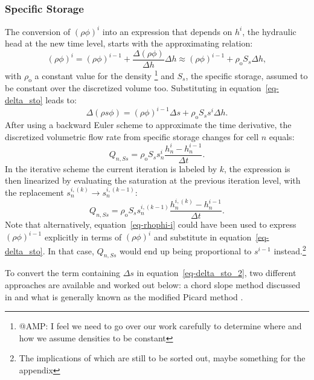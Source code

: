 \documentclass[fleqn]{article}
\begin{document}
\subsubsection*{Specific Storage}
The conversion of $(\rho\phi)^i$ into an expression that depends
on $h^i$, the hydraulic head at the new time level, starts with 
the approximating relation:
\begin{equation}
  (\rho\phi)^i =
  (\rho\phi)^{i-1} + \frac{\Delta (\rho\phi)}{\Delta h} \Delta h \approx
  (\rho\phi)^{i-1} + \rho_\textrm{o} S_s \Delta h,
  \label{eq-rhophi-i}
\end{equation}
with $\rho_{\textrm{o}}$ a constant value for the density
\footnote{@AMP: I feel we need to go over our work carefully to
determine where and how we assume densities to be constant}
and $S_s$, the specific storage, assumed to be constant over
the discretized volume too. Substituting in equation~\ref{eq-delta_sto}
leads to:
\begin{equation}
  \Delta \left ( \rho s \phi \right ) =
  (\rho \phi)^{i-1}\Delta s +
  \rho_{\textrm{o}} S_s s^i \Delta h.
  \label{eq-delta_sto_2}
\end{equation}
After using a backward Euler scheme to approximate the time
derivative, the discretized volumetric flow rate from specific
storage changes for cell $n$ equals:
\begin{equation}
  Q_{n,Ss} = \rho_{\textrm{o}} S_s s_n^i
  \frac{h_n^i - h_n^{i-1}}{\Delta t}.
\end{equation}
In the iterative scheme the current iteration is labeled
by $k$, the expression is then linearized by evaluating
the saturation at the previous iteration level, with the
replacement $s_n^{i,(k)} \rightarrow s_n^{i,(k-1)}$:
\begin{equation}
  Q_{n,Ss} = \rho_{\textrm{o}} S_s s_n^{i,(k-1)} 
  \frac{h_n^{i,(k)} - h_n^{i-1}}{\Delta t}.
\end{equation}
Note that alternatively, equation~\ref{eq-rhophi-i} could have
been used to express $(\rho\phi)^{i-1}$ explicitly in terms 
of $(\rho\phi)^i$ and substitute in equation~\ref{eq-delta_sto}. 
In that case, $Q_{n,Ss}$ would end up being proportional to 
$s^{i-1}$ instead.\footnote{The implications of which are still
to be sorted out, maybe something for the appendix}

To convert the term containing $\Delta s$ in 
equation~\ref{eq-delta_sto_2}, two different 
approaches are available and worked out below: 
a chord slope method discussed in \cite{rathfelder-1994}
and what is generally known as the modified Picard method
\cite{celia-1990}.
\end{document}
